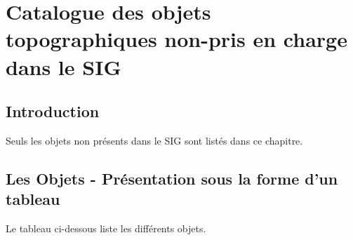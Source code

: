 \documentclass[12pt,titlepage,oneside]{book}
\begin{document}
\chapter{Catalogue des objets topographiques non-pris en charge dans le SIG}

\section{Introduction}
Seuls les objets non présents dans le SIG sont listés dans ce chapitre.


\section{Les Objets - Présentation sous la forme d'un tableau}
Le tableau ci-dessous liste les différents objets.
\vspace{\baselineskip}
\end{document}
